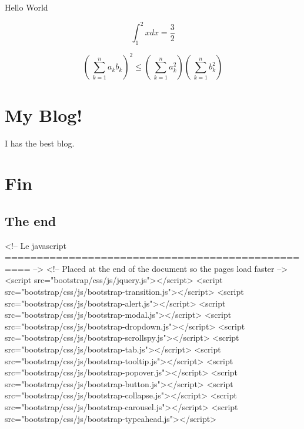 \documentclass{article}
\begin{document}
\newcommand{\mymath}[1]{%
\[#1\]
}

Hello World

\mymath{\int_1^2 xdx = \frac {3}{2}}

\mymath{\left(\, \sum_{k=1}^n a_k b_k \right)^2 \le \left(\, \sum_{k=1}^n a_k^2 \right) \left(\, \sum_{k=1}^n b_k^2 \right)}

\section{My Blog!}

I has the best blog.

\section{Fin}

\subsection{The end}

\begin{htmlonly}%
\begin{rawhtml}
    <!-- Le javascript
    ================================================== -->
    <!-- Placed at the end of the document so the pages load faster -->
    <script src="bootstrap/css/js/jquery.js"></script>
    <script src="bootstrap/css/js/bootstrap-transition.js"></script>
    <script src="bootstrap/css/js/bootstrap-alert.js"></script>
    <script src="bootstrap/css/js/bootstrap-modal.js"></script>
    <script src="bootstrap/css/js/bootstrap-dropdown.js"></script>
    <script src="bootstrap/css/js/bootstrap-scrollspy.js"></script>
    <script src="bootstrap/css/js/bootstrap-tab.js"></script>
    <script src="bootstrap/css/js/bootstrap-tooltip.js"></script>
    <script src="bootstrap/css/js/bootstrap-popover.js"></script>
    <script src="bootstrap/css/js/bootstrap-button.js"></script>
    <script src="bootstrap/css/js/bootstrap-collapse.js"></script>
    <script src="bootstrap/css/js/bootstrap-carousel.js"></script>
    <script src="bootstrap/css/js/bootstrap-typeahead.js"></script>
\end{rawhtml}
\end{htmlonly}
\end{document}
